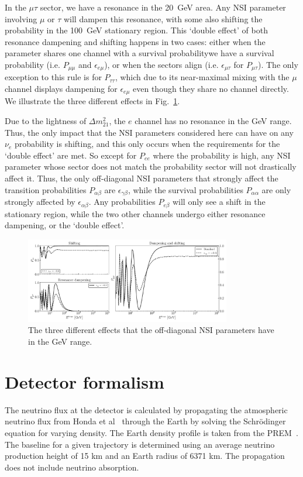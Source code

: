 \documentclass[draft=True]{revtex4-2}
\newcommand{\emt}{\ensuremath{\epsilon_{\mu\tau}}}
\newcommand{\eem}{\epsilon_{e\mu}}
\begin{document}
In the $\mu\tau$ sector, we have a resonance in the \SI{20}{\GeV} area. Any NSI parameter involving $\mu$ or $\tau$ will dampen this resonance,
with some also shifting the probability in the \SI{100}{\GeV} stationary region.
This `double effect' of both resonance dampening and shifting happens in two cases: either when the parameter shares one channel with a survival probabilitywe have a survival probability
(i.e. $P_{\mu\mu}$ and $\eem$), or when the sectors align (i.e. $\emt$ for $P_{\mu\tau}$). The only exception to this rule is for $P_{\tau\tau}$, 
which due to its near-maximal mixing with the $\mu$ channel displays dampening for $\eem$ even though they share no channel directly. We illustrate
the three different effects in Fig.~\ref{fig:nsi_probs}. 

Due to the lightness of $\Delta m^2_{21}$, the $e$ channel has no resonance in the GeV range. Thus, the only impact that 
the NSI parameters considered here can have on any $\nu_e$ probability is shifting, and this only occurs when the requirements for the `double effect'
are met. So except for $P_{ee}$ where the probability is high, any NSI parameter whose sector does not match the probability sector will not drastically affect it. 
Thus, the only off-diagonal NSI parameters that strongly affect the transition probabilities $P_{\alpha\beta}$ are $\epsilon_{\gamma\beta}$,
while the survival probabilities $P_{\alpha\alpha}$ are only strongly affected by  $\epsilon_{\alpha\beta}$. Any probabilities $P_{e\beta}$ will
only see a shift in the stationary region, while the two other channels undergo either resonance dampening, or the `double effect'.
\begin{figure}
   \includegraphics[width=0.8\textwidth]{figures/nsi_probs.pdf}
   \caption{The three different effects that the off-diagonal NSI parameters have in the \si{\GeV} range.}\label{fig:nsi_probs}
\end{figure}

\section{Detector formalism}
The neutrino flux at the detector is calculated by propagating the atmospheric neutrino flux from Honda et al~\cite{hondapaper} through the Earth by solving the 
Schrödinger equation for varying density. The Earth density profile is taken from the PREM~\cite{PREM}. The baseline for a given trajectory is determined using an average neutrino
production height of 15 km and an Earth radius of 6371 km. The propagation does not include neutrino absorption.
\end{document}
